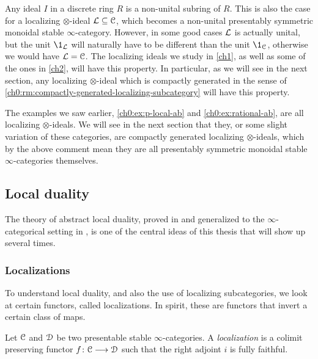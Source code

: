 Any ideal $I$ in a discrete ring $R$ is a non-unital subring of $R$. This is also the case for a localizing $\otimes$-ideal $\mathcal{L}\subseteq \EuScript{C}$, which becomes a non-unital presentably symmetric monoidal stable $\infty$-category. However, in some good cases $\mathcal{L}$ is actually unital, but the unit $\1_\L$ will naturally have to be different than the unit $\1_\C$, otherwise we would have $\mathcal{L}=\EuScript{C}$. The localizing ideals we study in \cref{ch1}, as well as some of the ones in \cref{ch2}, will have this property. In particular, as we will see in the next section, any localizing $\otimes$-ideal which is compactly generated in the sense of \cref{ch0:rm:compactly-generated-localizing-subcategory} will have this property.

\begin{example}
    The examples we saw earlier, \cref{ch0:ex:p-local-ab} and \cref{ch0:ex:rational-ab}, are all localizing $\otimes$-ideals. We will see in the next section that they, or some slight variation of these categories, are compactly generated localizing $\otimes$-ideals, which by the above comment mean they are all presentably symmetric monoidal stable $\infty$-categories themselves. 
\end{example}





\subsection{Local duality}
\label{ch0:ssec:local-duality}

The theory of abstract local duality, proved in \cite{hovey-palmiery-strickland_97} and generalized to the $\infty$-categorical setting in \cite{barthel-heard-valenzuela_2018}, is one of the central ideas of this thesis that will show up several times. 

\subsubsection{Localizations}

To understand local duality, and also the use of localizing subcategories, we look at certain functors, called localizations. In spirit, these are functors that invert a certain class of maps. 

\begin{definition}
    \label{ch0:def:localization}
    Let $\EuScript{C}$ and $\EuScript{D}$ be two presentable stable $\infty$-categories. A \emph{localization} is a colimit preserving functor $f\colon \EuScript{C}\longrightarrow \EuScript{D}$ such that the right adjoint $i$ is fully faithful.  
\end{definition}


